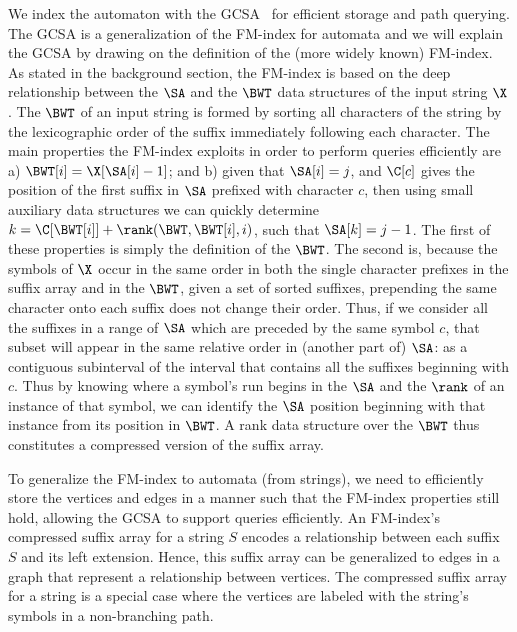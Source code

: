 \documentclass[doctor]{thesis}
\begin{document}
We index the automaton with the GCSA~\cite{dag_method} for efficient storage and path querying.  The GCSA is a generalization of the FM-index for automata and
we will explain the GCSA by drawing on the definition of the (more widely known) FM-index.  As stated in the background section, the FM-index is based on the deep relationship between the $\SA$ and the $\BWT$ data structures of the input string $\X$. The $\BWT$ of an input string is formed by sorting all characters of the string by the lexicographic order of the suffix immediately following each character.  The main properties the FM-index exploits in order to perform queries efficiently are a) $\BWT[i] = \X[\SA[i]-1]$; and 
b) given that $\SA[i] = j$, and $\C[c]$ gives the position of the first suffix in $\SA$ prefixed with character $c$, then using small auxiliary data structures we can quickly determine $k = \C[\BWT[i]] + \rank(\BWT,\BWT[i],i)$, such that $\SA[k] = j-1$.
The first of these properties is simply the definition of the $\BWT$.  The second is, because the symbols of $\X$ occur in the same order in both the single character prefixes in the suffix array and in the $\BWT$, given a set of sorted suffixes, prepending the same character onto each suffix does not change their order. Thus, if we consider all the suffixes in a range of $\SA$ which are preceded by the same symbol $c$, that subset will appear in the same relative order in (another part of) $\SA$: as a contiguous subinterval of the interval that contains all the suffixes beginning with $c$. Thus by knowing where a symbol's run begins in the $\SA$ and the $\rank$ of an instance of that symbol, we can identify the $\SA$ position beginning with that instance from its position in $\BWT$. A rank data structure over the $\BWT$ thus constitutes a compressed version of the suffix array. 





To generalize the FM-index to automata (from strings), we need to efficiently store the vertices and edges in a manner such that the FM-index properties still hold, allowing the GCSA to support queries efficiently.  An FM-index's compressed suffix array for a string $S$ encodes a relationship between each suffix $S$ and its left extension.  Hence, this suffix array can be generalized to edges in a graph that represent a relationship between vertices.  The compressed suffix array for a string is a special case where the vertices are labeled with the string's symbols in a non-branching path. 
\end{document}

